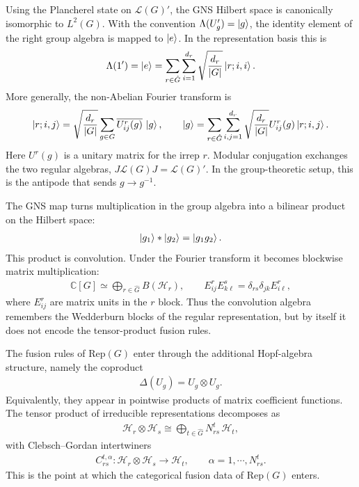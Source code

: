 \documentclass[11pt]{article}
\newcommand{\mH}{\mathcal{H}}
\begin{document}
Using the Plancherel state on $\mathcal L(G)'$, the GNS Hilbert space is
canonically isomorphic to $L^2(G)$. With the convention
$\Lambda(U'_g)=\ket g$, the identity element of the right group algebra is
mapped to $\ket e$. In the representation basis this is
\begin{align}
    \Lambda(1')=\ket e
    =\sum_{r\in\hat G}\sum_{i=1}^{d_r}
      \sqrt{\frac{d_r}{|G|}}\ket{r;i,i}.
\end{align}
More generally, the non-Abelian Fourier transform is
\begin{align}
    \ket{r;i,j}
    =\sqrt{\frac{d_r}{|G|}}\sum_{g\in G}
      \overline{U^r_{ij}(g)}\,\ket g,
    \qquad
    \ket g
    =\sum_{r\in\hat G}\sum_{i,j=1}^{d_r}
      \sqrt{\frac{d_r}{|G|}}U^r_{ij}(g)\ket{r;i,j}.
\end{align}
Here $U^r(g)$ is a unitary matrix for the irrep $r$. Modular conjugation
exchanges the two regular algebras, $J\mathcal{L}(G)J=\mathcal{L}(G)'$. In the group-theoretic setup, this is the antipode that sends $g\to g^{-1}$.

The GNS map turns multiplication in the group algebra into a bilinear product on
the Hilbert space:
\begin{align}
    \ket{g_1}*\ket{g_2}=\ket{g_1g_2}.
\end{align}
This product is convolution. Under the Fourier transform it becomes blockwise
matrix multiplication:
\begin{align}
    \mathbb C[G]\simeq \bigoplus_{r\in\hat G}B(\mH_r),
    \qquad
    E^r_{ij}E^s_{k\ell}
    =\delta_{rs}\delta_{jk}E^r_{i\ell},
\end{align}
where $E^r_{ij}$ are matrix units in the $r$ block. Thus the convolution
algebra remembers the Wedderburn blocks of the regular representation, but by
itself it does not encode the tensor-product fusion rules.

The fusion rules of $\mathrm{Rep}(G)$ enter through the additional Hopf-algebra
structure, namely the coproduct
\begin{align}
    \Delta(U_g)=U_g\otimes U_g.
\end{align}
Equivalently, they appear in pointwise products of matrix coefficient functions.
The tensor product of irreducible representations decomposes as
\begin{align}
    \mH_r\otimes\mH_s\cong
    \bigoplus_{t\in\hat G} N_{rs}^t\,\mH_t,
\end{align}
with Clebsch--Gordan intertwiners
\begin{align}
    C^{t,\alpha}_{rs}:\mH_r\otimes\mH_s\to\mH_t,
    \qquad \alpha=1,\cdots,N_{rs}^t.
\end{align}
This is the point at which the categorical fusion data of $\mathrm{Rep}(G)$
enters.
\end{document}
